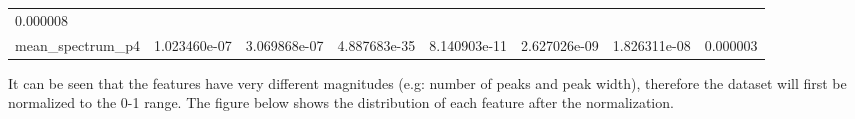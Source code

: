 \documentclass[11pt]{article}
\begin{document}
\begin{longtable}[]{@{}llllllll@{}}
\begin{minipage}[t]{0.08\columnwidth}
0.000008\strut
\end{minipage}\tabularnewline
\begin{minipage}[t]{0.16\columnwidth}\raggedright
mean\_spectrum\_p4\strut
\end{minipage} & \begin{minipage}[t]{0.09\columnwidth}\raggedright
1.023460e-07\strut
\end{minipage} & \begin{minipage}[t]{0.09\columnwidth}\raggedright
3.069868e-07\strut
\end{minipage} & \begin{minipage}[t]{0.09\columnwidth}\raggedright
4.887683e-35\strut
\end{minipage} & \begin{minipage}[t]{0.09\columnwidth}\raggedright
8.140903e-11\strut
\end{minipage} & \begin{minipage}[t]{0.09\columnwidth}\raggedright
2.627026e-09\strut
\end{minipage} & \begin{minipage}[t]{0.09\columnwidth}\raggedright
1.826311e-08\strut
\end{minipage} & \begin{minipage}[t]{0.08\columnwidth}\raggedright
0.000003\strut
\end{minipage}\tabularnewline
\bottomrule
\end{longtable}

It can be seen that the features have very different magnitudes (e.g:
number of peaks and peak width), therefore the dataset will first be
normalized to the 0-1 range. The figure below shows the distribution of
each feature after the normalization.
\end{document}
